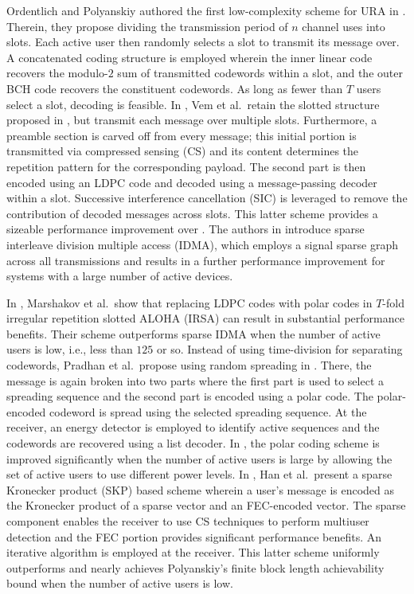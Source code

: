 \documentclass[journal]{IEEEtran}
\begin{document}
Ordentlich and Polyanskiy authored the first low-complexity scheme for URA in \cite{ordentlich2017isit}.  
Therein, they propose dividing the transmission period of $n$ channel uses into slots.
Each active user then randomly selects a slot to transmit its message over.  
A concatenated coding structure is employed wherein the inner linear code recovers the modulo-$2$ sum of transmitted codewords within a slot, and the outer BCH code recovers the constituent codewords.  
As long as fewer than $T$ users select a slot, decoding is feasible. 
In \cite{vem2017user}, Vem et al.\ retain the slotted structure proposed in \cite{ordentlich2017isit}, but transmit each message over multiple slots. 
Furthermore, a preamble section is carved off from every message; this initial portion is transmitted via compressed sensing (CS) and its content determines the repetition pattern for the corresponding payload.
The second part is then encoded using an LDPC code and decoded using a message-passing decoder within a slot.  
Successive interference cancellation (SIC) is leveraged to remove the contribution of decoded messages across slots.  
This latter scheme provides a sizeable performance improvement over \cite{ordentlich2017isit}.
The authors in \cite{pradhan2020sparse} introduce sparse interleave division multiple access (IDMA), which employs a signal sparse graph across all transmissions and results in a further performance improvement for systems with a large number of active devices.

In \cite{marshakov2019polar}, Marshakov et al.\ show that replacing LDPC codes with polar codes in $T$-fold irregular repetition slotted ALOHA (IRSA) can result in substantial performance benefits.
Their scheme outperforms sparse IDMA when the number of active users is low, i.e., less than $125$ or so.
Instead of using time-division for separating codewords, Pradhan et al.\ propose using random spreading in  \cite{pradhan2019polar}.  
There, the message is again broken into two parts where the first part is used to select a spreading sequence and the second part is encoded using a polar code.  
The polar-encoded codeword is spread using the selected spreading sequence.  
At the receiver, an energy detector is employed to identify active sequences and the codewords are recovered using a list decoder. 
In \cite{ahmadi2021random}, the polar coding scheme is improved significantly when the number of active users is large by allowing the set of active users to use different power levels.
In \cite{han2021sparse}, Han et al.\ present a sparse Kronecker product (SKP) based scheme wherein a user's message is encoded as the Kronecker product of a sparse vector and an FEC-encoded vector.
The sparse component enables the receiver to use CS techniques to perform multiuser detection and the FEC portion provides significant performance benefits.
An iterative algorithm is employed at the receiver.  
This latter scheme uniformly outperforms \cite{pradhan2019polar} and nearly achieves Polyanskiy's finite block length achievability bound when the number of active users is low.
\end{document}
